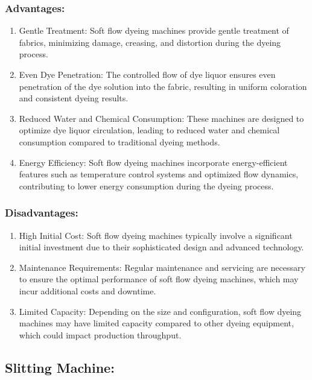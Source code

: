 \subsubsection{Advantages:}

\begin{enumerate}
\item
  Gentle Treatment: Soft flow dyeing machines provide gentle treatment
  of fabrics, minimizing damage, creasing, and distortion during the
  dyeing process.
\item
  Even Dye Penetration: The controlled flow of dye liquor ensures even
  penetration of the dye solution into the fabric, resulting in uniform
  coloration and consistent dyeing results.
\item
  Reduced Water and Chemical Consumption: These machines are designed to
  optimize dye liquor circulation, leading to reduced water and chemical
  consumption compared to traditional dyeing methods.
\item
  Energy Efficiency: Soft flow dyeing machines incorporate
  energy-efficient features such as temperature control systems and
  optimized flow dynamics, contributing to lower energy consumption
  during the dyeing process.
\end{enumerate}

\subsubsection{Disadvantages:}

\begin{enumerate}
\item
  High Initial Cost: Soft flow dyeing machines typically involve a
  significant initial investment due to their sophisticated design and
  advanced technology.
\item
  Maintenance Requirements: Regular maintenance and servicing are
  necessary to ensure the optimal performance of soft flow dyeing
  machines, which may incur additional costs and downtime.
\item
  Limited Capacity: Depending on the size and configuration, soft flow
  dyeing machines may have limited capacity compared to other dyeing
  equipment, which could impact production throughput.
\end{enumerate}

\subsection{Slitting Machine:}

